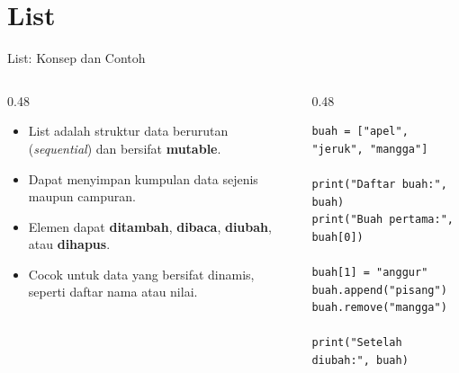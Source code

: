 \documentclass[aspectratio=169, table]{beamer}
\begin{document}
\section{List}

\begin{frame}[fragile]{List: Konsep dan Contoh}
\vspace{20pt}

\begin{columns}[T]
  \begin{column}{0.48\textwidth}
    \begin{itemize}
      \item List adalah struktur data berurutan (\textit{sequential}) dan bersifat \textbf{mutable}.
      \item Dapat menyimpan kumpulan data sejenis maupun campuran.
      \item Elemen dapat \textbf{ditambah}, \textbf{dibaca}, \textbf{diubah}, atau \textbf{dihapus}.
      \item Cocok untuk data yang bersifat dinamis, seperti daftar nama atau nilai.
    \end{itemize}
  \end{column}

  \begin{column}{0.48\textwidth}
    \begin{lstlisting}[style=PythonStyle]
buah = ["apel", "jeruk", "mangga"]

print("Daftar buah:", buah)
print("Buah pertama:", buah[0])

buah[1] = "anggur"
buah.append("pisang")
buah.remove("mangga")

print("Setelah diubah:", buah)
    \end{lstlisting}
  \end{column}
\end{columns}

\end{frame}
\end{document}
